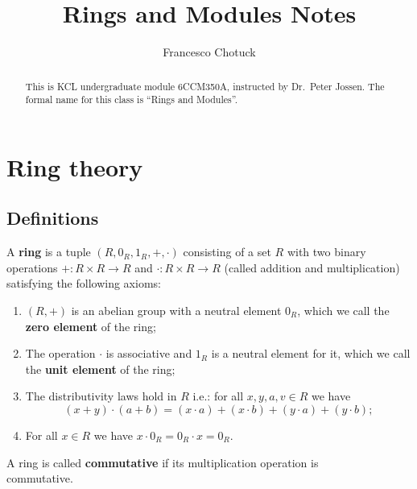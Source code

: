 \documentclass[12pt, a4paper]{article}
\title{Rings and Modules Notes}
\date{}
\author{Francesco Chotuck}
\begin{document}
\maketitle

\begin{abstract}
    \noindent This is KCL undergraduate module 6CCM350A, instructed by Dr.\ Peter Jossen. The formal name for this class is ``Rings and Modules''.
\end{abstract}

\tableofcontents

\pagebreak

\section{Ring theory}

\subsection{Definitions}

\begin{definition}
    A \textbf{ring} is a tuple \((R,0_R,1_R,+,\cdot)\) consisting of a set \(R\) with two binary operations \(+ : R \times R \to R\) and \(\cdot: R \times R \to R\) (called addition and multiplication) satisfying the following axioms:
    \begin{enumerate}
        \item \((R,+)\) is an abelian group with a neutral element \(0_R\), which we call the \textbf{zero element} of the ring;
        \item The operation \(\cdot\) is associative and \(1_R\) is a neutral element for it, which we call the \textbf{unit element} of the ring;
        \item The distributivity laws hold in \(R\) i.e.: for all \(x,y,a,v \in R\) we have 
        \[(x+y) \cdot (a+b)=(x \cdot a) + (x \cdot b) + (y\cdot a)+(y \cdot b);\]
        \item For all \(x \in R\) we have \(x \cdot 0_R = 0_R \cdot x = 0_R\).
    \end{enumerate}
\end{definition}

\begin{definition}
    A ring is called \textbf{commutative} if its multiplication operation is \\ commutative.
\end{definition}
\end{document}
